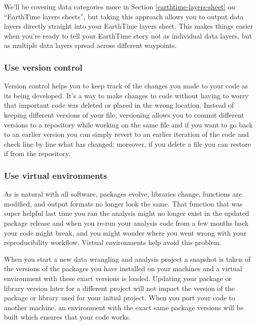 \documentclass[
  12pt,
]{krantz}
\begin{document}
We'll be covering data categories more in Section \ref{earthtime-layers-sheet} on ``EarthTime layers sheets'', but taking this approach allows you to output data layers directly straight into your EarthTime layers sheet. This makes things easier when you're ready to tell your EarthTime story not as individual data layers, but as multiple data layers spread across different waypoints.

\hypertarget{use-version-control}{%
\subsubsection*{Use version control}\label{use-version-control}}


Version control helps you to keep track of the changes you made to your code as its being developed. It's a way to make changes to code without having to worry that important code was deleted or placed in the wrong location. Instead of keeping different versions of your file, versioning allows you to commit different versions to a repository while working on the same file and if you want to go back to an earlier version you can simply revert to an earlier iteration of the code and check line by line what has changed; moreover, if you delete a file you can restore if from the repository.

\hypertarget{use-virtual-environments}{%
\subsubsection*{Use virtual environments}\label{use-virtual-environments}}


As is natural with all software, packages evolve, libraries change, functions are modified, and output formats no longer look the same. That function that was super helpful last time you ran the analysis might no longer exist in the updated package release and when you re-run your analysis code from a few months back your code might break, and you might wonder where you went wrong with your reproducibility workflow. Virtual environments help avoid this problem.

When you start a new data wrangling and analysis project a snapshot is taken of the versions of the packages you have installed on your machines and a virtual environment with these exact versions is loaded. Updating your package or library version later for a different project will not impact the version of the package or library used for your initial project. When you port your code to another machine, an environment with the exact same package versions will be built which ensures that your code works.
\end{document}
